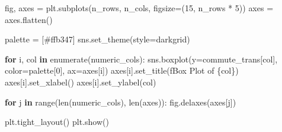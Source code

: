 \documentclass[
  number]{elsarticle}
\newenvironment{Shaded}{\begin{snugshade}}{\end{snugshade}}
\newcommand{\BuiltInTok}[1]{\textcolor[rgb]{0.00,0.23,0.31}{#1}}
\newcommand{\ControlFlowTok}[1]{\textcolor[rgb]{0.00,0.23,0.31}{\textbf{#1}}}
\newcommand{\DecValTok}[1]{\textcolor[rgb]{0.68,0.00,0.00}{#1}}
\newcommand{\KeywordTok}[1]{\textcolor[rgb]{0.00,0.23,0.31}{\textbf{#1}}}
\newcommand{\NormalTok}[1]{\textcolor[rgb]{0.00,0.23,0.31}{#1}}
\newcommand{\OperatorTok}[1]{\textcolor[rgb]{0.37,0.37,0.37}{#1}}
\newcommand{\SpecialCharTok}[1]{\textcolor[rgb]{0.37,0.37,0.37}{#1}}
\newcommand{\SpecialStringTok}[1]{\textcolor[rgb]{0.13,0.47,0.30}{#1}}
\newcommand{\StringTok}[1]{\textcolor[rgb]{0.13,0.47,0.30}{#1}}
\begin{document}
\begin{Shaded}
\begin{Highlighting}[]
\NormalTok{fig, axes }\OperatorTok{=}\NormalTok{ plt.subplots(n\_rows, n\_cols, figsize}\OperatorTok{=}\NormalTok{(}\DecValTok{15}\NormalTok{, n\_rows }\OperatorTok{*} \DecValTok{5}\NormalTok{))}
\NormalTok{axes }\OperatorTok{=}\NormalTok{ axes.flatten()}

\NormalTok{palette }\OperatorTok{=}\NormalTok{ [}\StringTok{\textquotesingle{}\#ffb347\textquotesingle{}}\NormalTok{]}
\NormalTok{sns.set\_theme(style}\OperatorTok{=}\StringTok{\textquotesingle{}darkgrid\textquotesingle{}}\NormalTok{)}

\ControlFlowTok{for}\NormalTok{ i, col }\KeywordTok{in} \BuiltInTok{enumerate}\NormalTok{(numeric\_cols):}
\NormalTok{    sns.boxplot(y}\OperatorTok{=}\NormalTok{commute\_trans[col], color}\OperatorTok{=}\NormalTok{palette[}\DecValTok{0}\NormalTok{], ax}\OperatorTok{=}\NormalTok{axes[i])}
\NormalTok{    axes[i].set\_title(}\SpecialStringTok{f\textquotesingle{}Box Plot of }\SpecialCharTok{\{}\NormalTok{col}\SpecialCharTok{\}}\SpecialStringTok{\textquotesingle{}}\NormalTok{)}
\NormalTok{    axes[i].set\_xlabel(}\StringTok{\textquotesingle{}\textquotesingle{}}\NormalTok{)}
\NormalTok{    axes[i].set\_ylabel(col)}

\ControlFlowTok{for}\NormalTok{ j }\KeywordTok{in} \BuiltInTok{range}\NormalTok{(}\BuiltInTok{len}\NormalTok{(numeric\_cols), }\BuiltInTok{len}\NormalTok{(axes)):}
\NormalTok{    fig.delaxes(axes[j])}

\NormalTok{plt.tight\_layout()}
\NormalTok{plt.show()}
\end{Highlighting}
\end{Shaded}
\end{document}
